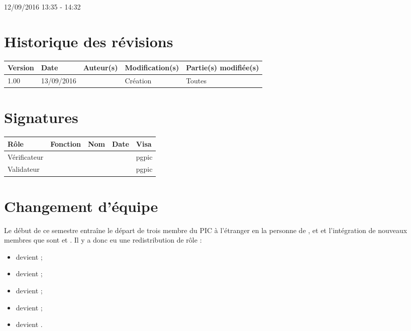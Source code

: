 \documentclass [a4paper] {article}
\begin{document}
12/09/2016			 				%
\hfill   
\hfill 	 13:35 - 14:32				%


\section*{Historique des révisions}
\begin{center}
			\begin{tabular}{| p{2.5cm} | p{3cm} | p{3cm} | p{3cm} | p{3.5cm} |}
				\hline
				\rowcolor{Gray}
				Version & Date & Auteur(s) & Modification(s) & Partie(s) modifiée(s)		 \\
				\hline
				1.00 & 13/09/2016 & \Kafui & Création & Toutes \\
		\hline		
			\end{tabular}
		\end{center}

\section*{Signatures}

		\begin{center}
			\begin{tabular}{| p{2.5cm} | p{4cm} | p{3cm} | p{3cm} | p{2.5cm} |}
				\hline
				\rowcolor{Gray}
				Rôle & Fonction & Nom & Date & Visa		 \\
				\hline
				Vérificateur & \RQA & \Melissa &  & pgpic \\[30pt]
				\hline
				Validateur & \CP & \Pierre &  & pgpic \\[30pt]	
				\hline
			\end{tabular}
		\end{center}

\section{Changement d'équipe}
Le début de ce semestre entraîne le départ de trois membre du PIC à l'étranger en la personne de \Mathieu, \Michel et \Sergi et l'intégration de nouveaux membres que sont \Francois et \Juliana. Il y a donc eu une redistribution de rôle :
\begin{itemize}
\item \Pierre{} devient \CP;
\item \Francois{} devient \CPA;
\item \Kafui{} devient \RQ;
\item \Julie{} devient \RD;
\item \Melissa{} devient \RGC.
\end{itemize}
\end{document}

